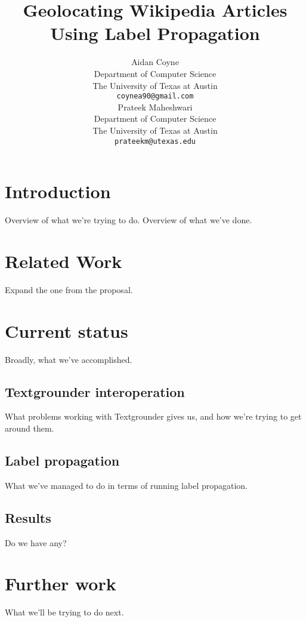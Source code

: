 \documentclass[11pt]{article}
\title{Geolocating Wikipedia Articles Using Label Propagation}
\author{
  Aidan Coyne \\
    Department of Computer Science\\
    The University of Texas at Austin\\
  {\tt coynea90@gmail.com} \\ 
  \And
  Prateek Maheshwari\\
    Department of Computer Science\\
    The University of Texas at Austin\\
  {\tt prateekm@utexas.edu}
}
\date{}
\begin{document}
\maketitle

\section{Introduction}
Overview of what we're trying to do.
Overview of what we've done.

\section{Related Work}
Expand the one from the proposal.

\section{Current status}
Broadly, what we've accomplished.

\subsection{Textgrounder interoperation}
What problems working with Textgrounder gives us, and how we're trying to get around them.

\subsection{Label propagation}
What we've managed to do in terms of running label propagation.

\subsection{Results}
Do we have any?

\section{Further work}
What we'll be trying to do next.



\end{document}
